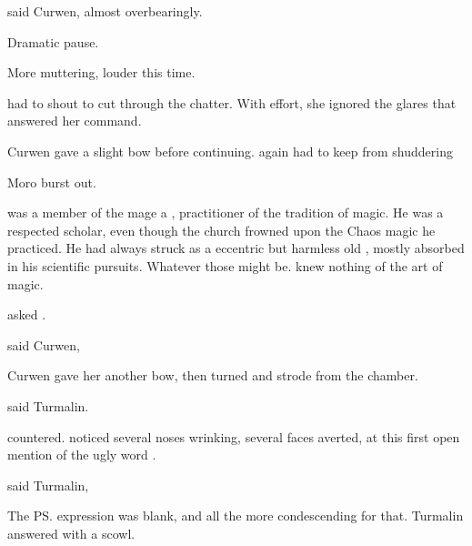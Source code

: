  said Curwen, almost overbearingly. 

Dramatic pause. 

More muttering, louder this time. 

 \Tiroco{} had to shout to cut through the chatter. 
With effort, she ignored the glares that answered her command. 

Curwen gave a slight bow before continuing. 
%
\dash again \Tiroco{} had to keep from shuddering\dash%

 Moro \Cornel{} burst out. 

\Onatol{} was a member of the mage \ishrah{}\dash a \rethyax, practitioner of the \Ortaican{} tradition of magic. 
He was a respected scholar, even though the church frowned upon the Chaos magic he practiced. 
He had always struck \Tiroco{} as a eccentric but harmless old \dax, mostly absorbed in his scientific pursuits. 
Whatever those might be. 
\Tiroco{} knew nothing of the art of magic. 

 asked \Tiroco. 

 said Curwen, 


Curwen gave her another bow, then turned and strode from the chamber. 

 said Turmalin. 

 \Mater{} \Vincerre{} countered. 
\Tiroco{} noticed several noses wrinking, several faces averted, at this first open mention of the ugly word . 

 said Turmalin, 

 The \ps{\mater} expression was blank, and all the more condescending for that. Turmalin answered with a scowl. 

